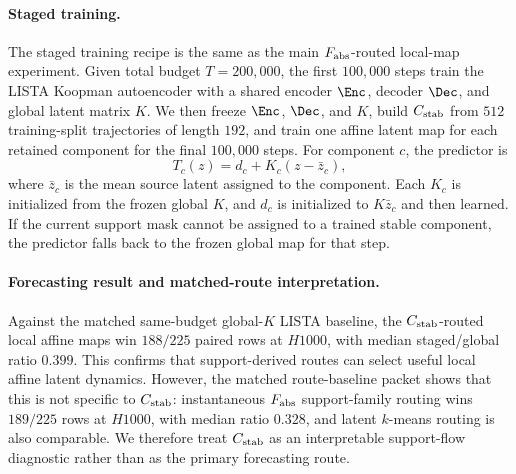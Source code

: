 \paragraph{Staged training.}
The staged training recipe is the same as the main \(F_{\rm abs}\)-routed local-map experiment. Given total budget \(T=200{,}000\), the first \(100{,}000\) steps train the LISTA Koopman autoencoder with a shared encoder \(\Enc\), decoder \(\Dec\), and global latent matrix \(K\). We then freeze \(\Enc\), \(\Dec\), and \(K\), build \(C_{\rm stab}\) from \(512\) training-split trajectories of length \(192\), and train one affine latent map for each retained component for the final \(100{,}000\) steps. For component \(c\), the predictor is
\begin{equation}
  T_c(z)=d_c+K_c(z-\bar z_c),
  \label{eq:cstab_local_affine}
\end{equation}
where \(\bar z_c\) is the mean source latent assigned to the component. Each \(K_c\) is initialized from the frozen global \(K\), and \(d_c\) is initialized to \(K\bar z_c\) and then learned. If the current support mask cannot be assigned to a trained stable component, the predictor falls back to the frozen global map for that step.

\paragraph{Forecasting result and matched-route interpretation.}
Against the matched same-budget global-\(K\) LISTA baseline, the \(C_{\rm stab}\)-routed local affine maps win \(188/225\) paired rows at \(H1000\), with median staged/global ratio \(0.399\). This confirms that support-derived routes can select useful local affine latent dynamics. However, the matched route-baseline packet shows that this is not specific to \(C_{\rm stab}\): instantaneous \(F_{\rm abs}\) support-family routing wins \(189/225\) rows at \(H1000\), with median ratio \(0.328\), and latent \(k\)-means routing is also comparable. We therefore treat \(C_{\rm stab}\) as an interpretable support-flow diagnostic rather than as the primary forecasting route.

\begin{table}[tbp]
\centering
\caption{\(C_{\rm stab}\)-routed staged local affine forecasting on the controlled multibasin benchmark. The baseline is the matched same-budget global-\(K\) LISTA model, with both models evaluated using the same periodic re-encoding grid. Lower staged/global ratios are better.}
\label{tab:cstab_local_k_forecasting}
{\setlength{\tabcolsep}{4pt}
\resizebox{0.86\textwidth}{!}{}}
\end{table}
